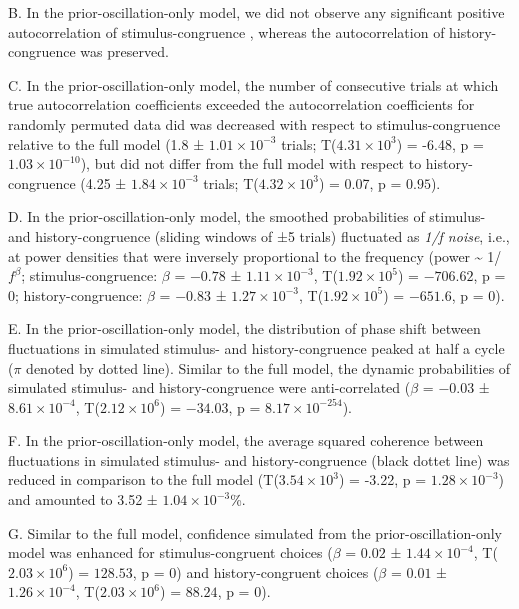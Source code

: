 \documentclass[
]{article}
\begin{document}
B. In the prior-oscillation-only model, we did not observe any
significant positive autocorrelation of stimulus-congruence , whereas
the autocorrelation of history-congruence was preserved.

C. In the prior-oscillation-only model, the number of consecutive trials
at which true autocorrelation coefficients exceeded the autocorrelation
coefficients for randomly permuted data did was decreased with respect
to stimulus-congruence relative to the full model (1.8 ±
\ensuremath{1.01\times 10^{-3}} trials;
T(\ensuremath{4.31\times 10^{3}}) = -6.48, p =
\(\ensuremath{1.03\times 10^{-10}}\)), but did not differ from the full
model with respect to history-congruence (4.25 ±
\ensuremath{1.84\times 10^{-3}} trials;
T(\ensuremath{4.32\times 10^{3}}) = 0.07, p = \(0.95\)).

D. In the prior-oscillation-only model, the smoothed probabilities of
stimulus- and history-congruence (sliding windows of ±5 trials)
fluctuated as \emph{1/f noise}, i.e., at power densities that were
inversely proportional to the frequency (power \textasciitilde{}
1/\(f^\beta\); stimulus-congruence: \(\beta\) = \(-0.78\) ±
\(\ensuremath{1.11\times 10^{-3}}\),
T(\(\ensuremath{1.92\times 10^{5}}\)) = \(-706.62\), p = \(0\);
history-congruence: \(\beta\) = \(-0.83\) ±
\(\ensuremath{1.27\times 10^{-3}}\),
T(\(\ensuremath{1.92\times 10^{5}}\)) = \(-651.6\), p = \(0\)).

E. In the prior-oscillation-only model, the distribution of phase shift
between fluctuations in simulated stimulus- and history-congruence
peaked at half a cycle (\(\pi\) denoted by dotted line). Similar to the
full model, the dynamic probabilities of simulated stimulus- and
history-congruence were anti-correlated (\(\beta\) = \(-0.03\) ±
\(\ensuremath{8.61\times 10^{-4}}\),
T(\(\ensuremath{2.12\times 10^{6}}\)) = \(-34.03\), p =
\(\ensuremath{8.17\times 10^{-254}}\)).

F. In the prior-oscillation-only model, the average squared coherence
between fluctuations in simulated stimulus- and history-congruence
(black dottet line) was reduced in comparison to the full model
(T(\ensuremath{3.54\times 10^{3}}) = -3.22, p =
\(\ensuremath{1.28\times 10^{-3}}\)) and amounted to 3.52 ±
\ensuremath{1.04\times 10^{-3}}\%.

G. Similar to the full model, confidence simulated from the
prior-oscillation-only model was enhanced for stimulus-congruent choices
(\(\beta\) = \(0.02\) ± \(\ensuremath{1.44\times 10^{-4}}\),
T(\(\ensuremath{2.03\times 10^{6}}\)) = \(128.53\), p = \(0\)) and
history-congruent choices (\(\beta\) = \(0.01\) ±
\(\ensuremath{1.26\times 10^{-4}}\),
T(\(\ensuremath{2.03\times 10^{6}}\)) = \(88.24\), p = \(0\)).
\end{document}
